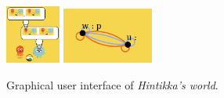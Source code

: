 \begin{figure}
	\begin{center}
		\includegraphics[width=1.8cm]{images/screenshot.png}
		\includegraphics[width=3cm]{images/hintikkas_world_epistemicmodel.png} 
	\end{center}
	\caption{Graphical user interface of \emph{Hintikka's world}.\label{figure:gui}}
\end{figure}
